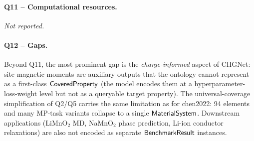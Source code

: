 \paragraph{Q11 -- Computational resources.}
\emph{Not reported.}


\paragraph{Q12 -- Gaps.}
Beyond Q11, the most prominent gap is the \emph{charge-informed}
aspect of CHGNet: site magnetic moments are auxiliary outputs that
the ontology cannot represent as a first-class
$\mathsf{CoveredProperty}$ (the model encodes them at a hyperparameter-
loss-weight level but not as a queryable target property). The
universal-coverage simplification of Q2/Q5 carries the same
limitation as for chen2022: 94 elements and many MP-task variants
collapse to a single $\mathsf{MaterialSystem}$. Downstream applications
(LiMnO$_2$ MD, NaMnO$_2$ phase prediction, Li-ion conductor relaxations)
are also not encoded as separate $\mathsf{BenchmarkResult}$ instances.
